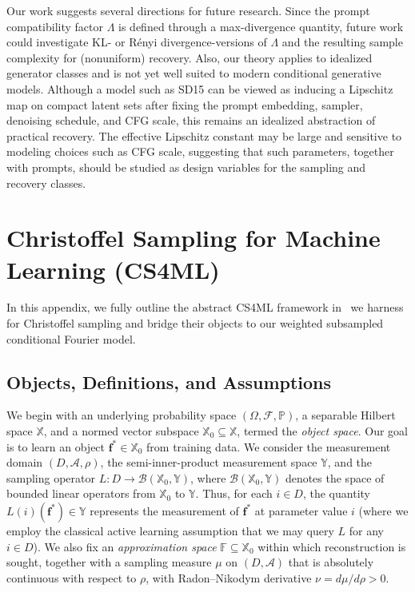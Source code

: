 \documentclass{article}
\theoremstyle{plain}
\theoremstyle{definition}
\theoremstyle{remark}
\begin{document}
Our work suggests several directions for future research. Since the prompt compatibility factor $\Lambda$ is defined through a max-divergence quantity, future work could investigate KL- or R\'{e}nyi divergence-versions of $\Lambda$ and the resulting sample complexity for (nonuniform) recovery. Also, our theory applies to idealized generator classes and is not yet well suited to modern conditional generative models. Although a model such as SD15 can be viewed as inducing a Lipschitz map on compact latent sets after fixing the prompt embedding, sampler, denoising schedule, and CFG scale, this remains an idealized abstraction of practical recovery. The effective Lipschitz constant may be large and sensitive to modeling choices such as CFG scale, suggesting that such parameters, together with prompts, should be studied as design variables for the sampling and recovery classes.











\appendix
\newpage\section{Christoffel Sampling for Machine Learning (CS4ML)}\label{app:cs4ml}

In this appendix, we fully outline the abstract CS4ML framework in~\cite{adcock2023cs4ml} we harness for Christoffel sampling and bridge their objects to our weighted subsampled conditional Fourier model.

\subsection{Objects, Definitions, and Assumptions}
We begin with an underlying probability space $(\Omega,\mathcal{F},\mathbb{P})$, a separable Hilbert space $\mathbb{X}$, and a normed vector subspace $\mathbb{X}_0 \subseteq \mathbb{X}$, termed the \emph{object space}. Our goal is to learn an object $\mathbf{f}^* \in \mathbb{X}_0$ from training data. We consider the measurement domain $(D,\mathcal{A},\rho)$, the semi-inner-product measurement space $\mathbb{Y}$, and the sampling operator $L : D \to \mathcal B(\mathbb{X}_0,\mathbb{Y})$, where $\mathcal B(\mathbb{X}_0,\mathbb{Y})$ denotes the space of bounded linear operators from $\mathbb{X}_0$ to $\mathbb{Y}$. Thus, for each $i \in D$, the quantity $L(i)(\mathbf{f}^*) \in \mathbb{Y}$ represents the measurement of $\mathbf{f}^*$ at parameter value $i$ (where we employ the classical active learning assumption that we may query $L$ for any $i \in D$). We also fix an \emph{approximation space} $\mathbb{F} \subseteq \mathbb{X}_0$ within which reconstruction is sought, together with a sampling measure $\mu$ on $(D,\mathcal{A})$ that is absolutely continuous with respect to $\rho$, with Radon--Nikodym derivative $\nu = d\mu/d\rho > 0$.
\end{document}
